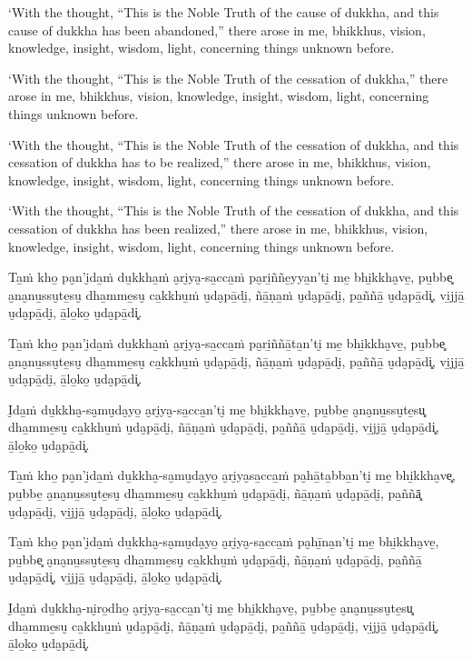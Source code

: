‘With the thought, “This is the Noble Truth of the cause of dukkha, and
this cause of dukkha has been abandoned,” there arose in me, bhikkhus,
vision, knowledge, insight, wisdom, light, concerning things unknown
before.

‘With the thought, “This is the Noble Truth of the cessation of dukkha,”
there arose in me, bhikkhus, vision, knowledge, insight, wisdom, light,
concerning things unknown before.

‘With the thought, “This is the Noble Truth of the cessation of dukkha,
and this cessation of dukkha has to be realized,” there arose in me,
bhikkhus, vision, knowledge, insight, wisdom, light, concerning things
unknown before.

‘With the thought, “This is the Noble Truth of the cessation of dukkha,
and this cessation of dukkha has been realized,” there arose in me,
bhikkhus, vision, knowledge, insight, wisdom, light, concerning things
unknown before.

\clearpage

\paliText
\markboth{\paliTitle}{\rightmark}

Ta̱ṁ kho̱ pa̮n'i̮da̱ṁ du̱kkha̱ṁ a̮ri̮ya̮-sa̱cca̱ṁ pa̮ri̱ññe̱yya̱n'ti̮ me̱ bhi̱kkha̮ve̱, pu̱bbe͓
a̮na̮nu̱ssu̮te̱su̮ dha̱mme̱su̮ ca̱kkhu̱ṁ u̮da̮pā̱di̮, ñā̱ṇa̱ṁ u̮da̮pā̱di̮, pa̱ññā̱ u̮da̮pā̱di͓,
vi̱jjā̱ u̮da̮pā̱di̮, ā̱lo̱ko̱ u̮da̮pā̱di͓.

Ta̱ṁ kho̱ pa̮n'i̮da̱ṁ du̱kkha̱ṁ a̮ri̮ya̮-sa̱cca̱ṁ pa̮ri̱ññā̱ta̱n'ti̮ me̱ bhi̱kkha̮ve̱, pu̱bbe͓
a̮na̮nu̱ssu̮te̱su̮ dha̱mme̱su̮ ca̱kkhu̱ṁ u̮da̮pā̱di̮, ñā̱ṇa̱ṁ u̮da̮pā̱di̮, pa̱ññā̱ u̮da̮pā̱di͓,
vi̱jjā̱ u̮da̮pā̱di̮, ā̱lo̱ko̱ u̮da̮pā̱di͓.

I̮da̱ṁ du̱kkha̮-sa̮mu̮da̮yo̱ a̮ri̮ya̮-sa̱cca̱n'ti̮ me̱ bhi̱kkha̮ve̱, pu̱bbe̱ a̮na̮nu̱ssu̮te̱su͓
dha̱mme̱su̮ ca̱kkhu̱ṁ u̮da̮pā̱di̮, ñā̱ṇa̱ṁ u̮da̮pā̱di̮, pa̱ññā̱ u̮da̮pā̱di̮, vi̱jjā̱ u̮da̮pā̱di͓,
ā̱lo̱ko̱ u̮da̮pā̱di͓.

Ta̱ṁ kho̱ pa̮n'i̮da̱ṁ du̱kkha̮-sa̮mu̮da̮yo̱ a̮ri̮ya̮sa̱cca̱ṁ pa̮hā̱ta̱bba̱n'ti̮ me̱ bhi̱kkha̮ve͓,
pu̱bbe̱ a̮na̮nu̱ssu̮te̱su̮ dha̱mme̱su̮ ca̱kkhu̱ṁ u̮da̮pā̱di̮, ñā̱ṇa̱ṁ u̮da̮pā̱di̮, pa̱ññā͓
u̮da̮pā̱di̮, vi̱jjā̱ u̮da̮pā̱di̮, ā̱lo̱ko̱ u̮da̮pā̱di͓.

Ta̱ṁ kho̱ pa̮n'i̮da̱ṁ du̱kkha̮-sa̮mu̮da̮yo̱ a̮ri̮ya̮-sa̱cca̱ṁ pa̮hī̱na̱n'ti̮ me̱ bhi̱kkha̮ve̱, pu̱bbe͓
a̮na̮nu̱ssu̮te̱su̮ dha̱mme̱su̮ ca̱kkhu̱ṁ u̮da̮pā̱di̮, ñā̱ṇa̱ṁ u̮da̮pā̱di̮, pa̱ññā̱ u̮da̮pā̱di͓,
vi̱jjā̱ u̮da̮pā̱di̮, ā̱lo̱ko̱ u̮da̮pā̱di͓.

I̮da̱ṁ du̱kkha̮-ni̮ro̱dho̱ a̮ri̮ya̮-sa̱cca̱n'ti̮ me̱ bhi̱kkha̮ve̱, pu̱bbe̱ a̮na̮nu̱ssu̮te̱su͓
dha̱mme̱su̮ ca̱kkhu̱ṁ u̮da̮pā̱di̮, ñā̱ṇa̱ṁ u̮da̮pā̱di̮, pa̱ññā̱ u̮da̮pā̱di̮, vi̱jjā̱ u̮da̮pā̱di͓,
ā̱lo̱ko̱ u̮da̮pā̱di͓.

